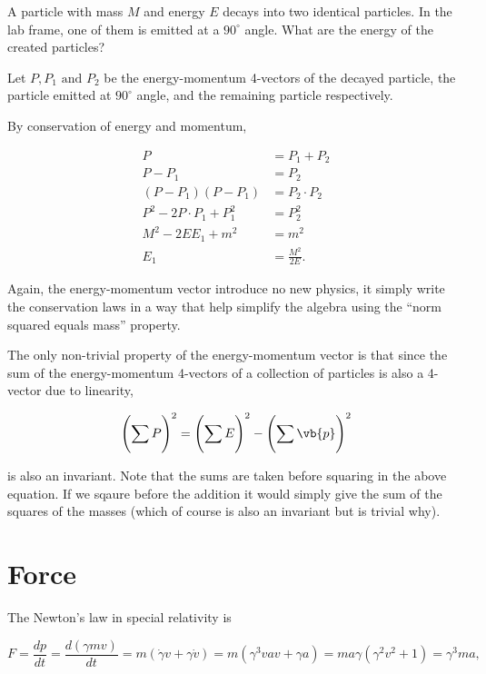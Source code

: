 \documentclass[english,a4paper,12pt]{report}
\begin{document}
{A particle with mass \(M\) and energy \(E\) decays into two identical particles. In the lab frame, one of them is emitted at a \(90 ^\circ \) angle. What are the energy of the created particles? }
{Let \(P, P_1 \text { and } P_2 \) be the energy-momentum 4-vectors of the decayed particle, the particle emitted at \(90 ^\circ \) angle, and the remaining particle respectively. 

By conservation of energy and momentum,

\begin{equation}
    \begin{aligned}
        P &= P_1 + P_2 \\
        P-P_1  &= P_2 \\
        (P - P_1 )(P - P_1 ) &= P_2 \cdot P_2 \\
        P^2 - 2 P \cdot  P_1  + P_1 ^2 &= P_2 ^2 \\
        M^2 - 2E E_1  + m^2 &= m^2 \\
        E_1  & = \frac{M^2}{2E}. 
    \end{aligned}
\end{equation}

Again, the energy-momentum vector introduce no new physics, it simply write the conservation laws in a way that help simplify the algebra using the ``norm squared equals mass'' property.
} 

The only non-trivial property of the energy-momentum vector is that since the sum of the energy-momentum 4-vectors of a collection of particles is also a 4-vector due to linearity, 

\begin{equation}
    \left( \sum_{}^{} P \right)^2 = \left( \sum_{}^{} E \right) ^2 - \left( \sum_{}^{} \vb{p}   \right) ^2 
\end{equation}

is also an invariant. Note that the sums are taken before squaring in the above equation. If we sqaure before the addition it would simply give the sum of the squares of the masses (which of course is also an invariant but is trivial why).


\section{Force}

The Newton's law in special relativity is 

\begin{equation}
    F = \frac{dp}{dt} = \frac{d(\gamma mv)}{dt} = m(\dot{\gamma }v + \gamma \dot{v}  ) = m(\gamma ^3 vav + \gamma a) = ma\gamma (\gamma ^2v^2 + 1) = \gamma ^3 ma,
\end{equation}
\end{document}
